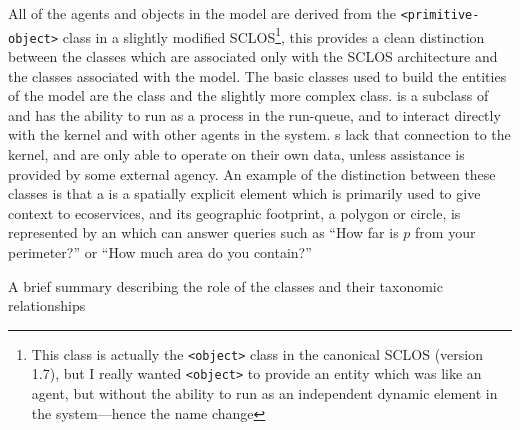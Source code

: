 All of the agents and objects in the model are derived
from the \texttt{<primitive-object>} class in a slightly modified
\textsf{SCLOS}\footnote{This class is actually the \texttt{<object>} class in
  the canonical \textsf{SCLOS} (version 1.7), but I really wanted
  \texttt{<object>} to provide an entity which was like an agent, but
  without the ability to run as an independent dynamic element in the
  system---hence the name change}, this provides a clean distinction
between the classes which are associated only with the \textsf{SCLOS}
architecture and the classes associated with the model.  The basic
classes used to build the entities of the model are the
 class and the slightly more complex 
class.  is a subclass of  and has the ability to
run as a process in the run-queue, and to interact directly with the
kernel and with other agents in the system.  s lack that
connection to the kernel, and are only able to operate on their own
data, unless assistance is provided by some external agency.  An
example of the distinction between these classes is that a 
is a spatially explicit  element which is primarily used to
give context to ecoservices, and its geographic footprint, a polygon
or circle, is represented by an  which can answer queries
such as ``How far is $p$ from your perimeter?'' or ``How much area do
you contain?'' 

A brief summary describing the role of the classes and their taxonomic
relationships 

